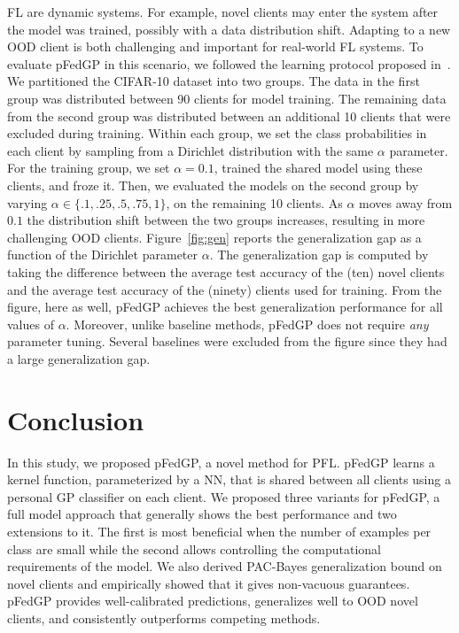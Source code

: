 \documentclass{article}
\begin{document}
FL are dynamic systems. For example, novel clients may enter the system after the model was trained, possibly with a data distribution shift. Adapting to a new OOD client is both challenging and important for real-world FL systems. To evaluate pFedGP in this scenario, we followed the learning protocol proposed in~\cite{shamsian2021personalized_icml}. We partitioned the CIFAR-10 dataset into two groups. The data in the first group was distributed between 90 clients for model training. The remaining data from the second group was distributed between an additional 10 clients that were excluded during training.
Within each group, we set the class probabilities in each client by sampling from a Dirichlet distribution with the same $\alpha$ parameter. For the training group, we set $\alpha=0.1$, trained the shared model using these clients, and froze it. Then, we evaluated the models on the second group by varying $\alpha\in\{.1, .25, .5, .75, 1\}$, on the remaining 10 clients. As $\alpha$ moves away from $0.1$ the distribution shift between the two groups increases, resulting in more challenging OOD clients. Figure~\ref{fig:gen} reports the generalization gap as a function of the Dirichlet parameter $\alpha$. The generalization gap is computed by taking the difference between the average test accuracy of the (ten) novel clients and the average test accuracy of the (ninety) clients used for training. From the figure, here as well, pFedGP achieves the best generalization performance for all values of $\alpha$. Moreover, unlike baseline methods, pFedGP does not require \textit{any} parameter tuning. Several baselines were excluded from the figure since they had a large generalization gap. 

\vspace{-5pt}
\section{Conclusion} \label{sec:discussion}
\vspace{-10pt}
In this study, we proposed pFedGP, a novel method for PFL. pFedGP learns a kernel function, parameterized by a NN, that is shared between all clients using a personal GP classifier on each client. We proposed three variants for pFedGP, a full model approach that generally shows the best performance and two extensions to it. The first is most beneficial when the number of examples per class are small while the second allows controlling the computational requirements of the model. We also derived PAC-Bayes generalization bound on novel clients and empirically showed that it gives non-vacuous guarantees. pFedGP provides well-calibrated predictions, generalizes well to OOD novel clients, and consistently outperforms competing methods.
\end{document}
